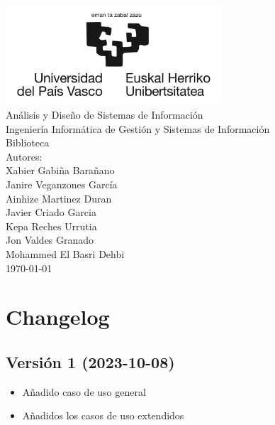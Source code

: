 \documentclass{report}
\begin{document}
    \begin{titlepage}
        \centering
        \includegraphics[width=0.6\textwidth]{./img/miscelanio/logo.jpg}\\
        \vspace{1cm}
        \LARGE Análisis y Diseño de Sistemas de Información\\
        \vspace{0.5cm}
        \Large Ingeniería Informática de Gestión y Sistemas de Información\\
        \vspace{3cm}
        \Huge Biblioteca\\
        \vspace{2.5cm}
        \Large Autores:\\
        \vspace{0.2cm}
        \large Xabier Gabiña Barañano\\
        \large Janire Veganzones García\\
        \large Ainhize Martinez Duran\\
        \large Javier Criado Garcia\\
        \large Kepa Reches Urrutia\\
        \large Jon Valdes Granado\\
        \large Mohammed El Basri Dehbi\\
        \vfill
        \today
    \end{titlepage}

    \tableofcontents
    \chapter{Changelog}
        \section{Versión 1 (2023-10-08)}
            \begin{itemize}
                \item Añadido caso de uso general
                \item Añadidos los casos de uso extendidos
            \end{itemize}   
\end{document}

